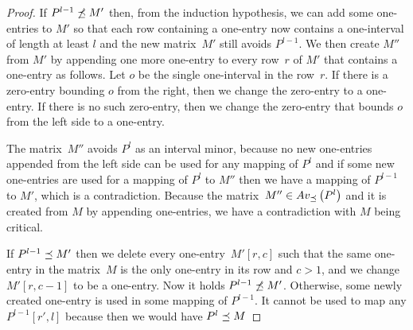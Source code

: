 \begin{proof}
If $P^{l-1}\not\preceq M'$ then, from the induction hypothesis, we can add some one-entries to $M'$ so that each row containing a one-entry now contains a one-interval of length at least $l$ and the new matrix~$M'$ still avoids $P^{l-1}$. We then create $M''$ from $M'$ by appending one more one-entry to every row~$r$ of $M'$ that contains a one-entry as follows. Let $o$ be the single one-interval in the row~$r$. If there is a zero-entry bounding $o$ from the right, then we change the zero-entry to a one-entry. If there is no such zero-entry, then we change the zero-entry that bounds $o$ from the left side to a one-entry.

The matrix~$M''$ avoids $P^{l}$ as an interval minor, because no new one-entries appended from the left side can be used for any mapping of $P^l$ and if some new one-entries are used for a mapping of $P^l$ to $M''$ then we have a mapping of $P^{l-1}$ to $M'$, which is a contradiction. Because the matrix~$M''\in Av_{\preceq}\left(P^l\right)$ and it is created from $M$ by appending one-entries, we have a contradiction with $M$ being critical.

If $P^{l-1}\preceq M'$ then we delete every one-entry~$M'[r,c]$ such that the same one-entry in the matrix~$M$ is the only one-entry in its row and $c>1$, and we change $M'[r,c-1]$ to be a one-entry. Now it holds $P^{l-1}\not\preceq M'$. Otherwise, some newly created one-entry is used in some mapping of $P^{l-1}$. It cannot be used to map any $P^{l-1}[r',l]$ because then we would have $P^l\preceq M$
\end{proof}

